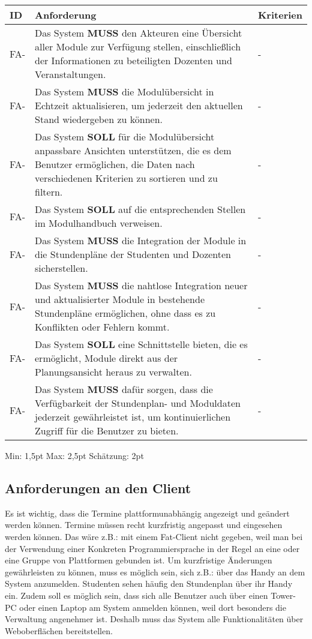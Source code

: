 \begin{tabular} {|p{}|p{11cm}|p{}|}
	\hline
	ID & Anforderung & Kriterien \\
	\hline
	FA-
	& Das System \textbf{MUSS} den Akteuren eine Übersicht aller Module zur Verfügung stellen, einschließlich der Informationen zu beteiligten Dozenten und Veranstaltungen. 
	& - \\
	\hline
	FA-
	& Das System \textbf{MUSS} die Modulübersicht in Echtzeit aktualisieren, um jederzeit den aktuellen Stand wiedergeben zu können. 
	& - \\
	\hline
	FA-
	& Das System \textbf{SOLL} für die Modulübersicht anpassbare Ansichten unterstützen, die es dem Benutzer ermöglichen, die Daten nach verschiedenen Kriterien zu sortieren und zu filtern. 
	& - \\
	\hline
	FA-
	& Das System \textbf{SOLL} auf die entsprechenden Stellen im Modulhandbuch verweisen. 
	& - \\
	\hline
	FA-
	& Das System \textbf{MUSS} die Integration der Module in die Stundenpläne der Studenten und Dozenten sicherstellen. 
	& - \\
	\hline
	FA-
	& Das System \textbf{MUSS} die nahtlose Integration neuer und aktualisierter Module in bestehende Stundenpläne ermöglichen, ohne dass es zu Konflikten oder Fehlern kommt. 
	& - \\
	\hline
	FA-
	& Das System \textbf{SOLL} eine Schnittstelle bieten, die es ermöglicht, Module direkt aus der Planungsansicht heraus zu verwalten. 
	& - \\
	\hline
	FA-
	& Das System \textbf{MUSS} dafür sorgen, dass die Verfügbarkeit der Stundenplan- und Moduldaten jederzeit gewährleistet ist, um kontinuierlichen Zugriff für die Benutzer zu bieten. 
	& - \\
	\hline
\end{tabular}
Min: 1,5pt
Max: 2,5pt
Schätzung: 2pt

\newpage

\subsection{Anforderungen an den Client}
Es ist wichtig, dass die Termine plattformunabhängig angezeigt und geändert werden können. Termine müssen recht kurzfristig angepasst und eingesehen werden können. Das wäre z.B.: mit einem Fat-Client nicht gegeben, weil man bei der Verwendung einer Konkreten Programmiersprache in der Regel an eine oder eine Gruppe von Plattformen gebunden ist. Um kurzfristige Änderungen gewährleisten zu können, muss es möglich sein, sich z.B.: über das Handy an dem System anzumelden. Studenten sehen häufig den Stundenplan über ihr Handy ein. Zudem soll es möglich sein, dass sich alle Benutzer auch über einen Tower-PC oder einen Laptop am System anmelden können, weil dort besonders die Verwaltung angenehmer ist. Deshalb muss das System alle Funktionalitäten über Weboberflächen bereitstellen.

